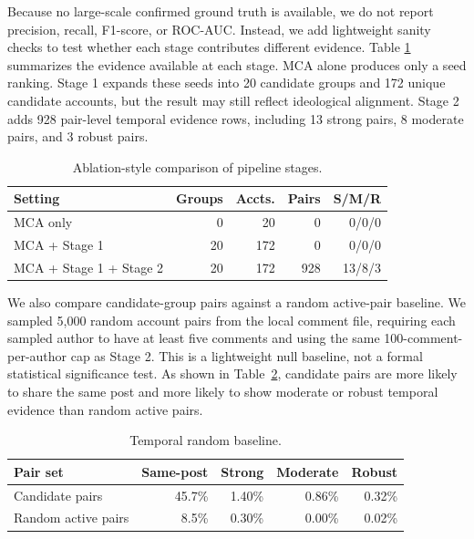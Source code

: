 \documentclass[conference]{IEEEtran}
\begin{document}
Because no large-scale confirmed ground truth is available, we do not report
precision, recall, F1-score, or ROC-AUC. Instead, we add lightweight sanity
checks to test whether each stage contributes different evidence. Table
\ref{tab:stageablation} summarizes the evidence available at each stage. MCA
alone produces only a seed ranking. Stage 1 expands these seeds into 20
candidate groups and 172 unique candidate accounts, but the result may still
reflect ideological alignment. Stage 2 adds 928 pair-level temporal evidence
rows, including 13 strong pairs, 8 moderate pairs, and 3 robust pairs.

\begin{table}[htbp]
\centering
\caption{Ablation-style comparison of pipeline stages.}
\label{tab:stageablation}
\scriptsize
\begin{tabular}{p{}rrrr}
\toprule
Setting & Groups & Accts. & Pairs & S/M/R \\
\midrule
MCA only & 0 & 20 & 0 & 0/0/0 \\
MCA + Stage 1 & 20 & 172 & 0 & 0/0/0 \\
MCA + Stage 1 + Stage 2 & 20 & 172 & 928 & 13/8/3 \\
\bottomrule
\end{tabular}
\end{table}

We also compare candidate-group pairs against a random active-pair baseline.
We sampled 5,000 random account pairs from the local comment file, requiring
each sampled author to have at least five comments and using the same
100-comment-per-author cap as Stage 2. This is a lightweight null baseline,
not a formal statistical significance test. As shown in
Table~\ref{tab:temporalbaseline}, candidate pairs are more likely to share the
same post and more likely to show moderate or robust temporal evidence than
random active pairs.

\begin{table}[htbp]
\centering
\caption{Temporal random baseline.}
\label{tab:temporalbaseline}
\scriptsize
\begin{tabular}{p{}rrrr}
\toprule
Pair set & Same-post & Strong & Moderate & Robust \\
\midrule
Candidate pairs & 45.7\% & 1.40\% & 0.86\% & 0.32\% \\
Random active pairs & 8.5\% & 0.30\% & 0.00\% & 0.02\% \\
\bottomrule
\end{tabular}
\end{table}
\end{document}

